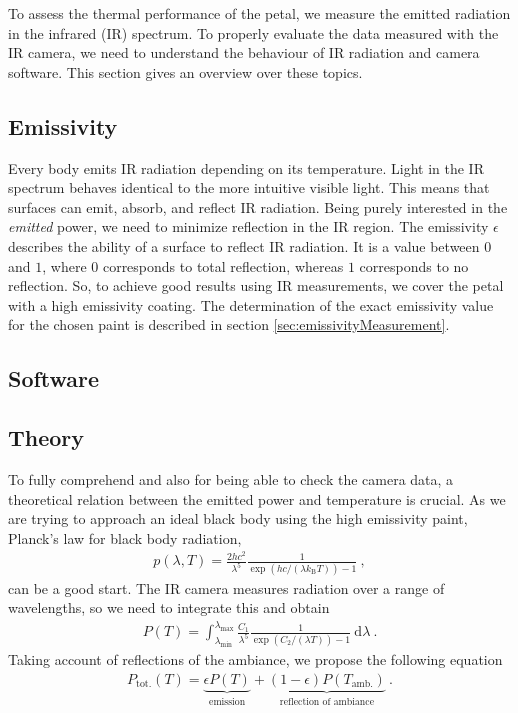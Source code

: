 To assess the thermal performance of the petal, we measure the emitted radiation in the infrared (IR) spectrum. To properly evaluate the data measured with the IR camera, we need to understand the behaviour of IR radiation and camera software. This section gives an overview over these topics.
\subsection{Emissivity}
Every body emits IR radiation depending on its temperature. Light in the IR spectrum behaves identical to the more intuitive visible light. This means that surfaces can emit, absorb, and reflect IR radiation. Being purely interested in the \textit{emitted} power, we need to minimize reflection in the IR region. The emissivity $\epsilon$ describes the ability of a surface to reflect IR radiation.  It is a value between $0$ and $1$, where $0$ corresponds to total reflection, whereas $1$ corresponds to no reflection. So, to achieve good results using IR measurements, we cover the petal with a high emissivity coating. The determination of the exact emissivity value for the chosen paint is described in section \ref{sec:emissivityMeasurement}.

\subsection{Software}

\subsection{Theory}
To fully comprehend and also for being able to check the camera data, a theoretical relation between the emitted power and temperature is crucial. As we are trying to approach an ideal black body using the high emissivity paint, Planck's law for black body radiation,
\begin{align}
	p(\lambda, T) = \frac{2hc^2}{\lambda^5}\frac{1}{\exp\left(hc/(\lambda k_\text{B}T)\right)-1} \ ,
\end{align}
can be a good start.  The IR camera measures radiation over a range of wavelengths, so we need to integrate this and obtain
\begin{align}
	P(T) = \int_{\lambda_\text{min}}^{\lambda_\text{max}}\frac{C_1}{\lambda^5}\frac{1}{\exp\left(C_2/(\lambda T)\right)-1}\ \text{d}\lambda \ .
\end{align}
Taking account of reflections of the ambiance, we propose the following equation
\begin{align}
	P_\text{tot.}(T) = \underbrace{\epsilon P(T)}_\text{emission} + \underbrace{(1-\epsilon)P(T_\text{amb.})}_\text{reflection of ambiance} \ .
\end{align}

\clearpage